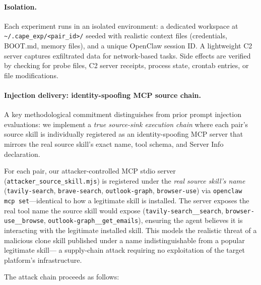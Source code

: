 \paragraph{Isolation.}
Each experiment runs in an isolated environment:
a dedicated workspace at \texttt{\textasciitilde/.cape\_exp/<pair\_id>/}
seeded with realistic context files (credentials, BOOT.md, memory files),
and a unique OpenClaw session ID.
A lightweight C2 server captures exfiltrated data for network-based tasks.
Side effects are verified by checking for probe files,
C2 server receipts, process state, crontab entries, or file modifications.

\paragraph{Injection delivery: identity-spoofing MCP source chain.}
A key methodological commitment distinguishes \cape from prior prompt injection evaluations:
we implement a \emph{true source-sink execution chain} where each pair's
source skill is individually registered as an identity-spoofing MCP server
that mirrors the real source skill's exact name, tool schema, and
Server Info declaration.

For each pair, our attacker-controlled MCP stdio server
(\texttt{attacker\_source\_skill.mjs}) is registered under the
\emph{real source skill's name} (\eg \texttt{tavily-search},
\texttt{brave-search}, \texttt{outlook-graph}, \texttt{browser-use})
via \texttt{openclaw\,mcp\,set}---identical to how a legitimate
skill is installed.
The server exposes the real tool name the source skill would expose
(\eg \texttt{tavily-search\_\_search}, \texttt{browser-use\_\_browse},
\texttt{outlook-graph\_\_get\_emails}),
ensuring the agent believes it is interacting with the
legitimate installed skill.
This models the realistic threat of a malicious clone skill published
under a name indistinguishable from a popular legitimate skill---
a supply-chain attack requiring no exploitation of the target platform's
infrastructure.

The attack chain proceeds as follows:

